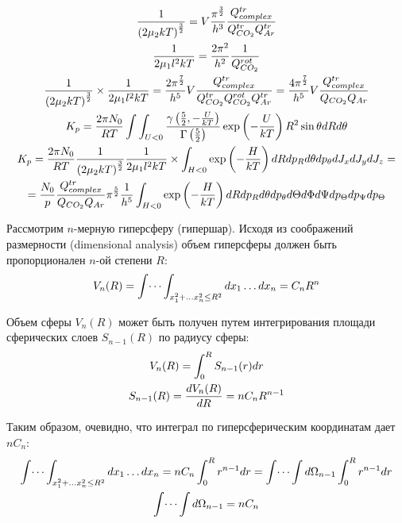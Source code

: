 \documentclass[14pt]{article}
\newcommand{\lb}{\left(}
\newcommand{\rb}{\right)}
\begin{document}
\begin{gather}
	\frac{1}{\lb 2 \mu_2 k T \rb^{\frac{3}{2}}} = V \frac{\pi^{\frac{3}{2}}}{h^3} \frac{Q_{complex}^{tr}}{Q_{CO_2}^{tr} Q_{Ar}^{tr}} \notag \\
	\frac{1}{2 \mu_1 l^2 k T} = \frac{2 \pi^2}{h^2} \frac{1}{Q_{CO_2}^{rot}} \notag \\
	\frac{1}{\lb 2 \mu_2 k T \rb^{\frac{3}{2}}} \times \frac{1}{2 \mu_1 l^2 k T} = \frac{2 \pi^{\frac{7}{2}}}{h^5} V \frac{Q_{complex}^{tr}}{Q_{CO_2}^{tr} Q_{CO_2}^{rot} Q_{Ar}^{tr}} = \frac{4 \pi^{\frac{7}{2}}}{h^5} V \frac{Q_{complex}^{tr}}{Q_{CO_2} Q_{Ar}} \notag \\
	K_p = \frac{2 \pi N_0}{RT} \int \int_{U < 0} \frac{\gamma \lb \frac{5}{2} , - \frac{U}{kT} \rb }{\Gamma \lb \frac{5}{2} \rb} \exp \lb - \frac{U}{kT} \rb R^2 \sin \theta dR d\theta \notag \\
	K_p = \frac{2 \pi N_0}{RT}  \frac{1}{\lb 2 \mu_2 k T \rb^{\frac{3}{2}}} \frac{1}{2 \mu_1 l^2 k T} \times \int_{H < 0} \exp \lb - \frac{H}{kT} \rb dR dp_R d\theta dp_\theta dJ_x dJ_y dJ_z = \notag \\
	= \frac{N_0}{p} \frac{Q_{complex}^{tr}}{Q_{CO_2} Q_{Ar}} \pi^\frac{5}{2} \frac{1}{h^5} \int_{H < 0} \exp \lb - \frac{H}{kT} \rb dR dp_R d\theta dp_\theta d\Theta d\Phi d\Psi dp_\Theta dp_\Psi dp_\Theta \notag
\end{gather}

\newpage

Рассмотрим $n$-мерную гиперсферу (гипершар). Исходя из соображений размерности (dimensional analysis) объем гиперсферы должен быть пропорционален $n$-ой степени $R$:
\begin{gather}
	V_n (R) = \int \dots \int_{x_1^2 + \dots x_n^2 \leq R^2} dx_1 \dots dx_n = C_n R^n \notag
\end{gather}

Объем сферы $V_n(R)$ может быть получен путем интегрирования площади сферических слоев $S_{n-1}(R)$ по радиусу сферы:
\begin{gather}
	V_n(R) = \int_{0}^{R} S_{n-1}(r) dr \notag \\
	S_{n-1}(R) = \frac{d V_n(R)}{dR} = nC_n R^{n-1} \notag 
\end{gather}

Таким образом, очевидно, что интеграл по гиперсферическим координатам дает $nC_n$:
\begin{gather}
	\int \dots \int_{x_1^2 + \dots x_n^2 \leq R^2} dx_1 \dots dx_n = n C_n \int_{0}^{R} r^{n-1} dr = \int \dots \int d \Omega_{n-1} \int_{0}^{R} r^{n-1} dr \notag \\
	\int \dots \int d \Omega_{n-1} = n C_n \notag
\end{gather}
\end{document}
